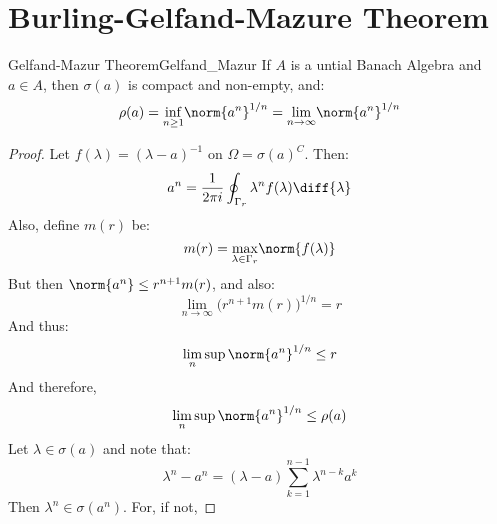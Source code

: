     \section{Burling-Gelfand-Mazure Theorem}
        \begin{ltheorem}{Gelfand-Mazur Theorem}{Gelfand_Mazur}
            If $A$ is a untial Banach Algebra and $a\in{A}$, then
            $\sigma(a)$ is compact and non-empty, and:
            \begin{equation}
                \rho(a)=\underset{n\geq{1}}{\inf}
                    \norm{a^{n}}^{1/n}
                =\underset{n\rightarrow\infty}{\lim}
                    \norm{a^{n}}^{1/n}
            \end{equation}
        \end{ltheorem}
        \begin{proof}
            Let $f(\lambda)=(\lambda-a)^{\minus{1}}$ on
            $\Omega=\sigma(a)^{C}$. Then:
            \begin{equation}
                a^{n}=\frac{1}{2\pi{i}}\oint_{\Gamma_{r}}
                    \lambda^{n}f(\lambda)\diff{\lambda}
            \end{equation}
            Also, define $m(r)$ be:
            \begin{equation}
                m(r)=\underset{\lambda\in\Gamma_{r}}{\max}
                    \norm{f(\lambda)}
            \end{equation}
            But then $\norm{a^{n}}\leq{r}^{n+1}m(r)$, and
            also:
            \begin{equation}
                \underset{n\rightarrow\infty}{\lim}
                    \big(r^{n+1}m(r)\big)^{1/n}=r
            \end{equation}
            And thus:
            \begin{equation}
                \underset{n}{\lim}\sup\norm{a^{n}}^{1/n}
                    \leq{r}
            \end{equation}
            And therefore,
            \begin{equation}
                \underset{n}{\lim}\sup\norm{a^{n}}^{1/n}
                    \leq\rho(a)
            \end{equation}
            Let $\lambda\in\sigma(a)$ and note that:
            \begin{equation}
                \lambda^{n}-a^{n}=(\lambda-a)
                    \sum_{k=1}^{n-1}\lambda^{n-k}a^{k}
            \end{equation}
            Then $\lambda^{n}\in\sigma(a^{n})$. For, if not,

\end{proof}
